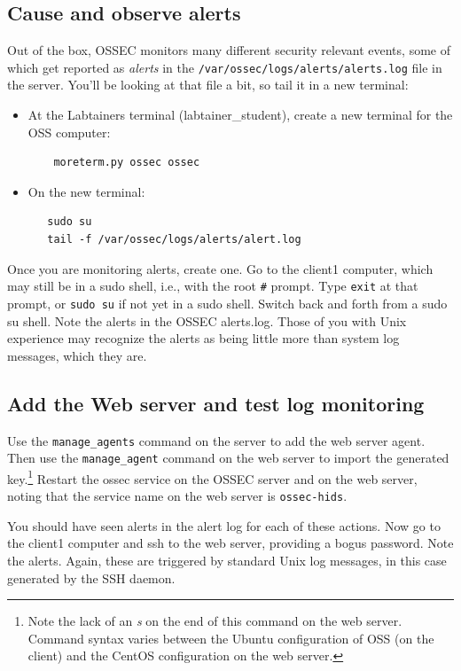 \subsection{Cause and observe alerts}
Out of the box, OSSEC monitors many different security relevant events, some of which get reported as \textit{alerts} in the
{\tt /var/ossec/logs/alerts/alerts.log} file in the server.  You'll be looking at that file a bit, so tail it in a new terminal:
\begin{itemize}
\item At the Labtainers terminal (labtainer_student), create a new terminal for the OSS computer:
\begin{verbatim}
    moreterm.py ossec ossec
\end{verbatim}
\item On the new terminal:
\begin{verbatim}
   sudo su
   tail -f /var/ossec/logs/alerts/alert.log
\end{verbatim}
\end{itemize}
Once you are monitoring alerts, create one.  Go to the client1 computer, which may still be in a sudo shell, i.e., with
the root {\tt \#} prompt.  Type {\tt exit} at that prompt, or {\tt sudo su} if not yet in a sudo shell. 
Switch back and forth from a sudo su shell.  Note the alerts in
the OSSEC alerts.log.  Those of you with Unix experience may recognize the alerts as being little more than system log 
messages, which they are.  

\subsection{Add the Web server and test log monitoring}
Use the {\tt manage\_agents} command on the server to add the web server agent.  Then use the {\tt manage\_agent} command
on the web server to import the generated key.\footnote{Note the lack of an \textit{s} on the end of this command on the
web server.  Command syntax varies between the Ubuntu configuration of OSS (on the client) and the CentOS configuration
on the web server.}  Restart the ossec service on the OSSEC server and on the web server, noting that the service name
on the web server is {\tt ossec-hids}.

You should have seen alerts in the alert log for each of these actions.  Now go to the client1 computer and ssh to the web server, 
providing a bogus password.  Note the alerts.  Again, these are triggered by standard Unix log messages, in this case generated
by the SSH daemon.

